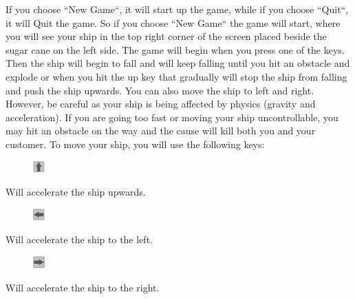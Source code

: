\documentclass[../master.tex]{subfiles}
\begin{document}
If you choose ``New Game``, it will start up the game, while if you choose ``Quit``, it will Quit the game. So if you choose ``New Game`` the game will start, where you will see your ship in the top right corner of the screen placed beside the sugar cane on the left side. The game will begin when you press one of the keys. Then the ship will begin to fall and will keep falling until you hit an obstacle and explode or when you hit the up key that gradually will stop the ship from falling and push the ship upwards. You can also move the ship to left and right. However, be careful as your ship is being affected by physics (gravity and acceleration). If you are going too fast or moving your ship uncontrollable, you may hit an obstacle on the way and the cause will kill both you and your customer. To move your ship, you will use the following keys:\\
\begin{figure}
	\vspace{-6.9mm}
	\begin{centering}
		\includegraphics[width=0.04\textwidth]{./Pictures/Pil_op.png}
	\end{centering}
	\vspace{-6mm}
\end{figure}
Will accelerate the ship upwards.\\

\begin{figure}
	\vspace{-6.9mm}
	\begin{centering}
		\includegraphics[width=0.04\textwidth]{./Pictures/Pil_venstre.png}
	\end{centering}
	\vspace{-6mm}
\end{figure}
Will accelerate the ship to the left.\\

\begin{figure}
	\vspace{-6.9mm}
	\begin{centering}
		\includegraphics[width=0.04\textwidth]{./Pictures/Pil_right.png}
	\end{centering}
	\vspace{-6mm}
\end{figure}
Will accelerate the ship to the right.\\
\end{document}

